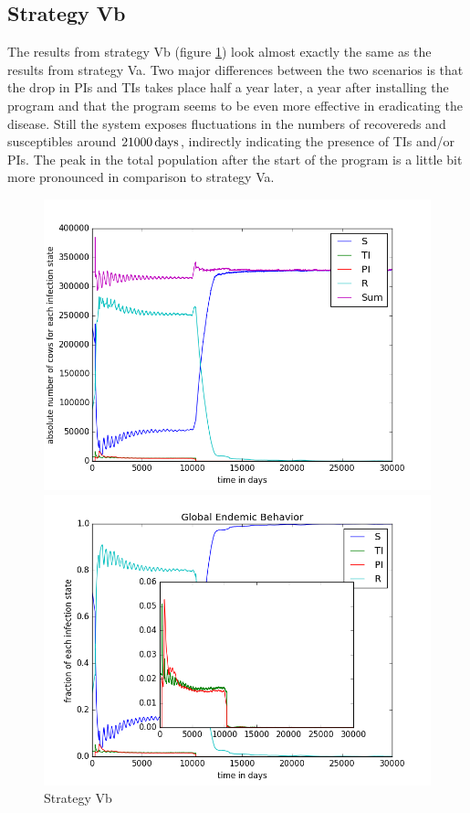 \subsection{Strategy Vb}
The results from strategy Vb (figure \ref{fig:contStrat5b}) look almost exactly the same as the results from strategy Va. Two major differences between the two scenarios is that the drop in PIs and TIs takes place half a year later, a year after installing the program and that the program seems to be even more effective in eradicating the disease. Still the system exposes fluctuations in the numbers of recovereds and susceptibles around $21000\,\text{days}$, indirectly indicating the presence of TIs and/or PIs. The peak in the total population after the start of the program is a little bit more pronounced in comparison to strategy Va.
\begin{figure}[htbp]
\begin{minipage}{0.5\textwidth}
\centering
\noindent\includegraphics[width=0.95\linewidth,height=\textheight,
keepaspectratio]{cont5btotalEndemicNumbers.png} 
\end{minipage}
\begin{minipage}{0.5\textwidth}
\centering
\noindent\includegraphics[width=0.95\linewidth,height=\textheight,
keepaspectratio]{cont5bpendemicFractions.png} 
\end{minipage}
\caption[Endemic Behavior in Containment Strategy Five B]{Strategy Vb}
\label{fig:contStrat5b}
\end{figure}

